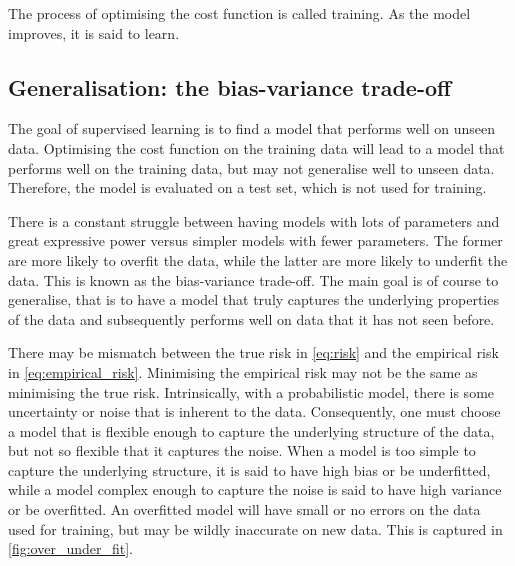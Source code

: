 The process of optimising the cost function is called training.
As the model improves, it is said to learn.

\subsection{Generalisation: the bias-variance trade-off}
The goal of supervised learning is to find a model that performs well on unseen data.
Optimising the cost function on the training data will lead to a model that performs well on the training data, but may not generalise well to unseen data.
Therefore, the model is evaluated on a test set, which is not used for training.

There is a constant struggle between having models with lots of parameters and great expressive power versus simpler models with fewer parameters.
The former are more likely to overfit the data, while the latter are more likely to underfit the data.
This is known as the bias-variance trade-off.
The main goal is of course to generalise, that is to have a model that truly captures the underlying properties of the data and subsequently performs well on data that it has not seen before.

There may be mismatch between the true risk in \cref{eq:risk} and the empirical risk in \cref{eq:empirical_risk}.
Minimising the empirical risk may not be the same as minimising the true risk.
Intrinsically, with a probabilistic model, there is some uncertainty or noise that is inherent to the data.
Consequently, one must choose a model that is flexible enough to capture the underlying structure of the data, but not so flexible that it captures the noise.
When a model is too simple to capture the underlying structure, it is said to have high bias or be underfitted, while a model complex enough to capture the noise is said to have high variance or be overfitted.
An overfitted model will have small or no errors on the data used for training, but may be wildly inaccurate on new data.
This is captured in \cref{fig:over_under_fit}.


